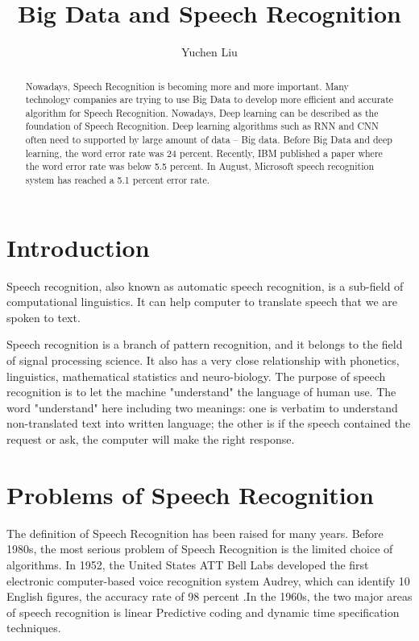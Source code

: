\documentclass[sigconf]{acmart}
\begin{document}
\title{Big Data and Speech Recognition}


\author{Yuchen Liu}




\begin{abstract}
Nowadays, Speech Recognition is becoming more and more important. Many technology companies are trying to use Big Data to develop more efficient and accurate algorithm for Speech Recognition. Nowadays, Deep learning can be described as the foundation of Speech Recognition. Deep learning algorithms such as RNN and CNN often need to supported by large amount of data -- Big data.  Before Big Data and deep learning, the word error rate was 24 percent. Recently, IBM published a paper where the word error rate was below 5.5 percent. In August, Microsoft speech recognition system has reached a 5.1 percent error rate.
\end{abstract}



\maketitle

\section{Introduction}
Speech recognition, also known as automatic speech recognition, is a sub-field of computational linguistics. It can help computer to translate speech that we are spoken to text. \citep{wiki}

Speech recognition is a branch of pattern recognition, and it belongs to the field of signal processing science. It also has a very close relationship with phonetics, linguistics, mathematical statistics and neuro-biology. The purpose of speech recognition is to let the machine "understand" the language of human use. The word "understand" here including two meanings: one is verbatim to understand non-translated text into written language; the other is if the speech contained the request or ask, the computer will make the right response.


\section{Problems of Speech Recognition}
The definition of Speech Recognition has been raised for many years. Before 1980s, the most serious problem of Speech Recognition is the limited choice of algorithms. In 1952, the United States ATT Bell Labs developed the first electronic computer-based voice recognition system Audrey\cite{audrey}, which can identify 10 English figures, the accuracy rate of 98 percent .In the 1960s, the two major areas of speech recognition is linear Predictive coding and dynamic time specification techniques.
\end{document}
